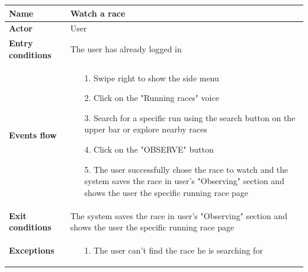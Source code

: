 \begin{table}[]
\begin{adjustbox}{width=\textwidth}
\footnotesize
\begin{tabular}{|p{}|p{}|}
\hline
\textbf{Name}             &  Watch a race\\ \hline
\textbf{Actor}            &  User\\ \hline
\textbf{Entry conditions} &  The user has already logged in\\ \hline
\textbf{Events flow}      &
	\begin{itemize}
		\item[1.] Swipe right to show the side menu
		\item[2.] Click on the "Running races" voice
		\item[3.] Search for a specific run using the search button on the upper bar or explore nearby races
		\item[4.] Click on the "OBSERVE" button
		\item[5.] The user successfully chose the race to watch and the system saves the race in user's "Observing" section and shows the user the specific running race page
	\end{itemize}\\ \hline
\textbf{Exit conditions}  &  The system saves the race in user's "Observing" section and shows the user the specific running race page\\ \hline
\textbf{Exceptions}       &
	\begin{itemize}
		\item[1.] The user can't find the race he is searching for
	\end{itemize}\\ \hline
\end{tabular}
\end{adjustbox}
\end{table}

